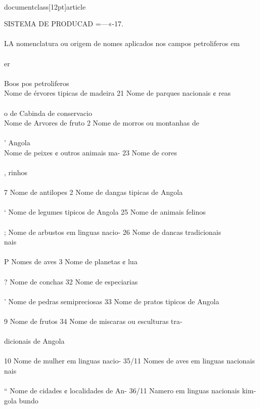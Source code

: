 \\documentclass[12pt]{article}
\begin{document}
SISTEMA DE PRODUCAD =—«-17.\\
\\
LA nomenclatura ou origem de nomes aplicados nos campos petroliferos em\\
\\
er\\
\\
Boos pos petroliferos\\
Nome de érvores tipicas de madeira 21 Nome de parques nacionais ¢ reas\\
\\
o de Cabinda de conservacio\\
Nome de Arvores de fruto 2 Nome de morros ou montanhas de\\
\\
' Angola\\
Nome de peixes ¢ outros animais ma- 23 Nome de cores\\
\\
, rinhos\\
\\
7 Nome de antilopes 2 Nome de dangas tipicas de Angola\\
\\
‘ Nome de legumes tipicos de Angola 25 Nome de animais felinos\\
\\
; Nome de arbustos em linguas nacio- 26 Nome de dancas tradicionais\\
nais\\
\\
P Nomes de aves 3 Nome de planetas ¢ lua\\
\\
? Nome de conchas 32 Nome de especiarias\\
\\
' Nome de pedras semipreciosas 33 Nome de pratos tipicos de Angola\\
\\
9 Nome de frutos 34 Nome de miscaras ou esculturas tra-\\
\\
dicionais de Angola\\
\\
10 Nome de mulher em linguas nacio- 35/11 Nomes de aves em linguas nacionais\\
nais\\
\\
“ Nome de cidades ¢ localidades de An- 36/11 Namero em linguas nacionais kim-\\
gola bundo\\
\\
\end{document}
